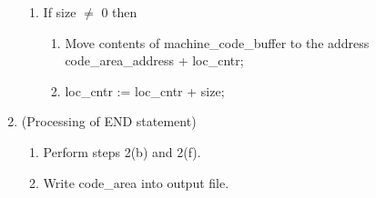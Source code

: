 \documentclass{scrreprt}
\begin{document}
\begin{enumerate}
\begin{enumerate}
\item If size $\neq$ 0 then
\begin{enumerate}
\item  Move contents of machine_code_buffer to the address code_area_address + loc_cntr;
\item loc_cntr := loc_cntr + size;
\end{enumerate}
\end{enumerate}
\item (Processing of END statement)
\begin{enumerate}
\item Perform steps 2(b) and 2(f).
\item Write code_area into output file.
\end{enumerate}

\end{enumerate}
\end{document}
